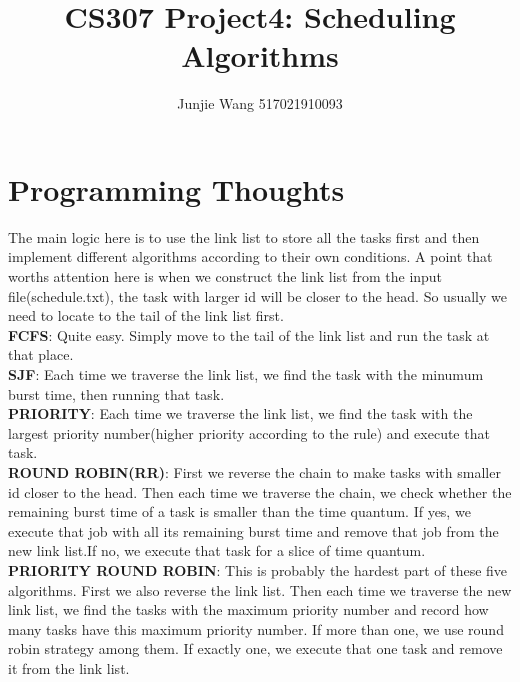 \documentclass[12pt]{extarticle}
\title{CS307 Project4: Scheduling Algorithms}
\author{Junjie Wang 517021910093}
\newcommand{\<}{\langle}
\renewcommand{\>}{\rangle}
\theoremstyle{definition}
\begin{document}
	\maketitle
	\section{Programming Thoughts}
	The main logic here is to use the link list to store all the tasks first and then implement different algorithms according to their own conditions. A point that worths attention here is when we construct the link list from the input file(schedule.txt), the task with larger id will be closer to the head. So usually we need to locate to the tail of the link list first.\\
	\textbf{FCFS}: Quite easy. Simply move to the tail of the link list and run the task at that place. \\
	\textbf{SJF}: Each time we traverse the link list, we find the task with the minumum burst time, then running that task. \\
	\textbf{PRIORITY}: Each time we traverse the link list, we find the task with the largest priority number(higher priority according to the rule) and execute that task. \\
	\textbf{ROUND ROBIN(RR)}: First we reverse the chain to make tasks with smaller id closer to the head. Then each time we traverse the chain, we check whether the remaining burst time of a task is smaller than the time quantum. If yes, we execute that job with all its remaining burst time and remove that job from the new link list.If no, we execute that task for a slice of time quantum. \\
	\textbf{PRIORITY ROUND ROBIN}: This is probably the hardest part of these five algorithms. First we also reverse the link list. Then each time we traverse the new link list, we find the tasks with the maximum priority number and record how many tasks have this maximum priority number. If more than one, we use round robin strategy among them. If exactly one, we execute that one task and remove it from the link list.
\end{document}
